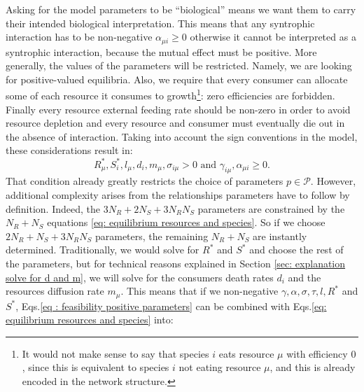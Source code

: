 \documentclass[12pt, titlepage]{report}
\begin{document}
Asking for the model parameters to be ``biological'' means we want them to carry their intended biological interpretation. This means \eg that any syntrophic interaction has to be non-negative $\alpha_{\mu i} \geq 0 $ otherwise it cannot be interpreted as a syntrophic interaction, because the mutual effect must be positive. More generally, the values of the parameters will be restricted.
Namely, we are looking for positive-valued equilibria. %
Also, we require that every consumer can allocate some of each resource it consumes to growth\footnote{It would not make sense to say that species $i$ eats resource $\mu$ with efficiency $0$, since this is equivalent to species $i$ not eating resource $\mu$, and this is already encoded in the network structure.}: zero efficiencies are forbidden. Finally every resource external feeding rate should be non-zero in order to avoid resource depletion and every resource and consumer must eventually die out in the absence of interaction. Taking into account the sign conventions in the model, these considerations result in:
\begin{equation}
{
R^*_\mu, S^*_i, l_\mu, d_i, m_\mu, \sigma_{i\mu} > 0 \text { and } \gamma_{i\mu}, \alpha_{\mu i} \geq 0.
}
\label{eq : feasibility positive parameters}
\end{equation}
That condition already greatly restricts the choice of parameters $p\in \mathcal{P}$. However, additional complexity arises from the relationships parameters have to follow by definition. Indeed, the $3 N_R +2 N_S + 3 N_R N_S $ parameters are constrained by the $N_R + N_S $ equations \eqref{eq: equilibrium resources and species}. So if we choose $2 N_R + N_S + 3 N_R N_S$ parameters, the remaining $N_R + N_S$ are instantly determined. Traditionally, we would solve for $R^*$ and $S^*$ and choose the rest of the parameters, but for technical reasons explained in Section \ref{sec: explanation solve for d and m}, we will solve for the consumers death rates $d_i$ and the resources diffusion rate $m_\mu$. This means that if we  non-negative $\gamma, \alpha, \sigma, \tau, l, R^*$ and $S^*$, Eqs.\eqref{eq : feasibility positive parameters} can be combined with Eqs.\ref{eq: equilibrium resources and species} into:
\end{document}
